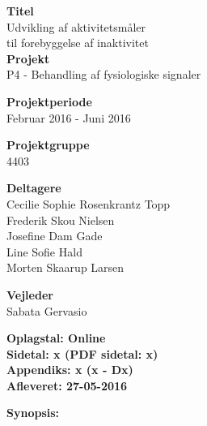 \begin{minipage}[t]{0.48\textwidth}
\textbf{Titel} \\[5pt]\hspace*{2ex} 
Udvikling af aktivitetsmåler\\\hspace*{2ex}
til forebyggelse af inaktivitet\\


\textbf{Projekt} \\[5pt]\hspace*{2ex} 
P4 - Behandling af fysiologiske signaler\\\hspace*{2ex}


\textbf{Projektperiode} \\[5pt]\bigskip\hspace{2ex}
Februar 2016 - Juni 2016

\textbf{Projektgruppe} \\[5pt]\bigskip\hspace{2ex}
4403

\textbf{Deltagere} \\[5pt]\hspace*{2ex}
Cecilie Sophie Rosenkrantz Topp \\\hspace*{2ex}
Frederik Skou Nielsen \\\hspace*{2ex}
Josefine Dam Gade \\\hspace*{2ex}
Line Sofie Hald \\\hspace*{2ex}
Morten Skaarup Larsen \\\bigskip\hspace{2ex}


\textbf{Vejleder} \\[5pt]\hspace*{2ex}
Sabata Gervasio \\\bigskip\hspace{2ex}


\vspace*{1cm}

\textbf{Oplagstal: Online} \\
\textbf{Sidetal: x (PDF sidetal: x)} \\
\textbf{Appendiks: x (x - Dx)} \\ 
\textbf{Afleveret: 27-05-2016}

\end{minipage}
\hfill
\begin{minipage}[t]{0.483\textwidth}
\textbf{Synopsis:} \\[5pt]
\fbox{\parbox{8cm}{\bigskip\bigskip}}
\end{minipage}

